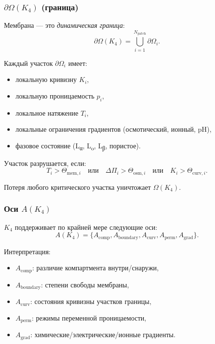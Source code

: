 \subsubsection{\texorpdfstring{$\partial\Omega(K_4)$}{\partial\Omega(K_4)} (граница)}

Мембрана — это \emph{динамическая граница}:
\[
\partial\Omega(K_4) = \bigcup_{i=1}^{N_{\mathrm{patch}}}
    \partial\Omega_i.
\]

Каждый участок $\partial\Omega_i$ имеет:
\begin{itemize}
    \item локальную кривизну $K_i$,
    \item локальную проницаемость $p_i$,
    \item локальное натяжение $T_i$,
    \item локальные ограничения градиентов (осмотический, ионный, pH),
    \item фазовое состояние (L\textsubscript{α}, L\textsubscript{o},
          L\textsubscript{β}, пористое).
\end{itemize}

Участок разрушается, если:
\[
T_i > \Theta_{\mathrm{mem},i}
\quad \text{или} \quad
\Delta \Pi_i > \Theta_{\mathrm{osm},i}
\quad \text{или} \quad
K_i > \Theta_{\mathrm{curv},i}.
\]

Потеря любого критического участка уничтожает $\Omega(K_4)$.

\subsubsection{Оси \texorpdfstring{$A(K_4)$}{A(K_4)}}

$K_4$ поддерживает по крайней мере следующие оси:
\[
A(K_4) = \{ A_{\mathrm{comp}}, A_{\mathrm{boundary}},
           A_{\mathrm{curv}}, A_{\mathrm{perm}}, A_{\mathrm{grad}}\}.
\]

Интерпретация:
\begin{itemize}
    \item $A_{\mathrm{comp}}$: различие компартмента внутри/снаружи,
    \item $A_{\mathrm{boundary}}$: степени свободы мембраны,
    \item $A_{\mathrm{curv}}$: состояния кривизны участков границы,
    \item $A_{\mathrm{perm}}$: режимы переменной проницаемости,
    \item $A_{\mathrm{grad}}$: химические/электрические/ионные градиенты.
\end{itemize}

